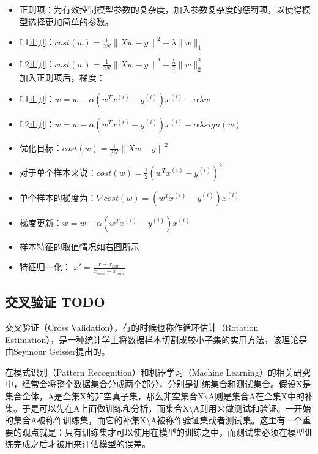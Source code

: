 \documentclass[10pt,a4paper]{ctexbook}
\begin{document}
\begin{itemize}
\item 正则项：为有效控制模型参数的复杂度，加入参数复杂度的惩罚项，以使得模型选择更加简单的参数。
\item L1正则：$cost(w)={\frac {1}{2N}}\left\|{Xw-y}\right\|^{2}+\lambda\|w\|_{1}$
\item L2正则：$cost(w)={\frac {1}{2N}}\left\|{Xw-y}\right\|^{2}+{\frac {\lambda}{2}}\|w\|_{2}^{2}$
\\

加入正则项后，梯度：
\item L1正则：$w=w-\alpha (w^{T}x^{(i)}-y^{(i)})x^{(i)} - \alpha\lambda w$
\item L2正则：$w=w-\alpha (w^{T}x^{(i)}-y^{(i)})x^{(i)} - \alpha\lambda sign(w)$
\end{itemize}

\begin{itemize}
\item 优化目标：$cost(w)={\frac {1}{2N}}\left\|{Xw-y}\right\|^{2}$
\item 对于单个样本来说：$cost(w)={\frac {1}{2}}\left({w^{T}x^{(i)}-y^{(i)}}\right)^{2}$
\item 单个样本的梯度为：$\nabla cost(w)=(w^{T}x^{(i)}-y^{(i)})x^{(i)}$
\item 梯度更新：$w=w-\alpha (w^{T}x^{(i)}-y^{(i)})x^{(i)}$
\item 样本特征的取值情况如右图所示
\item 特征归一化： $x'={\frac {x - x_{min}}{x_{max} - x_{min}}}$

\end{itemize}

\subsection{交叉验证{\color{red} TODO}}

交叉验证（Cross Validation），有的时候也称作循环估计（Rotation Estimation），是一种统计学上将数据样本切割成较小子集的实用方法，该理论是由Seymour Geisser提出的。

在模式识别（Pattern Recognition）和机器学习（Machine Learning）的相关研究中，经常会将整个数据集合分成两个部分，分别是训练集合和测试集合。假设X是集合全体，A是全集X的非空真子集，那么非空集合X\textbackslash{A}则是集合A在全集X中的补集。于是可以先在A上面做训练和分析，而集合X\textbackslash{A}则用来做测试和验证。一开始的集合A被称作训练集，而它的补集X\textbackslash{A}被称作验证集或者测试集。这里有一个重要的观点就是：只有训练集才可以使用在模型的训练之中，而测试集必须在模型训练完成之后才被用来评估模型的误差。
\end{document}
